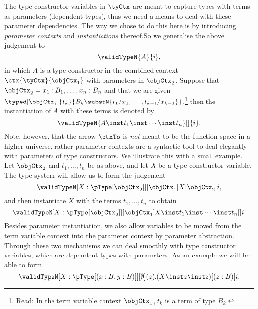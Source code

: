 \documentclass[preprint]{sigplanconf}
\begin{document}
The type constructor variables in $\tyCtx$ are meant to capture types with terms
as parameters (dependent types), thus we need a means to deal with these
parameter dependencies.
The way we chose to do this here is by introducing \emph{parameter contexts}
and \emph{instantiations} thereof.So we generalise the above judgement to
\begin{equation*}
  \validTypeN{A}{i},
\end{equation*}
in which $A$ is a type constructor in the combined context
$\ctx{\tyCtx}{\objCtx_1}$ with parameters in $\objCtx_2$.
Suppose that $\objCtx_2 = x_1 : B_1, \dotsc, x_n : B_n$ and that we
are given
$\typed[\objCtx_1]{t_k}{B_k \substN{t_1/x_1, \dotsc, t_{k-1}/x_{k-1}}}$,\footnote{
  Read: In the term variable context $\objCtx_1$, $t_k$ is a term of type
  $B_k$.}
then the instantiation of $A$ with these terms is denoted by
\begin{equation*}
  \validTypeN{A \inst t_1 \inst \dotsb \inst t_n}[]{i}.
\end{equation*}
Note, however, that the arrow $\ctxTo$ is \emph{not} meant to be the function
space in a higher universe, rather parameter contexts are a syntactic tool to
deal elegantly with parameters of type constructors.
We illustrate this with a small example.
Let $\objCtx_2$ and $t_1, \dotsc, t_n$ be as above,
and let $X$ be a type constructor variable.
The type system will allow us to form the judgement
\begin{equation*}
  \validTypeN[X : {\pType[\objCtx_2]}][\objCtx_1]{X}[\objCtx_2]{i},
\end{equation*}
and then instantiate $X$ with the terms $t_1, \dotsc, t_n$ to obtain
\begin{equation*}
  \validTypeN[X : {\pType[\objCtx_2]}][\objCtx_1]
  {X \inst t_1 \inst \dotsb \inst t_n}[]{i}.
\end{equation*}
Besides parameter instantiation, we also allow variables to be moved from the
term variable context into the parameter context by parameter abstraction.
Through these two mechanisms we can deal smoothly with type constructor
variables, which are dependent types with parameters.
As an example we will be able to form
\begin{equation*}
  \validTypeN[X : {\pType[(x : B, y : B)]}][\emptyset]
  {(z).(X \inst z \inst z)}[(z:B)]{i}.
\end{equation*}
\end{document}
